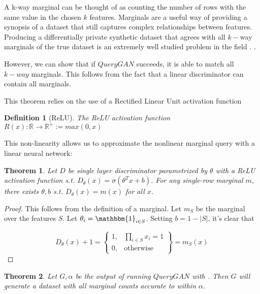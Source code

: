 \documentclass[]{article}
\newtheorem{definition}{Definition}[section]
\newtheorem{theorem}{Theorem}[section]
\theoremstyle{definition}
\begin{document}
A k-way marginal can be thought of as counting the number of rows with the same value in the chosen $k$ features. Marginals are a useful way of providing a synopsis of a dataset that still captures complex relationships between features. Producing a differentially private synthetic dataset that agrees with all $k-$way marginals of the true dataset is an extremely well studied problem in the field . .

However, we can show that if $QueryGAN$ succeeds, it is able to match all $k-way$ marginals. This follows from the fact that a linear discriminator can contain all marginals.

This theorem relies on the use of a Rectified Linear Unit activation function

\begin{definition}[ReLU]
    The ReLU activation function $R(x) : \mathbb{R} \to \mathbb{R}^+ := max(0,x)$
\end{definition}

This non-linearity allows us to approximate the nonlinear marginal query with a linear neural network:

\begin{theorem}\label{thm:d-marginal}
    Let $D$ be single layer discriminator parametrized by $\theta$ with a ReLU activation function s.t. $D_\theta(x) = \sigma(\theta^Tx + b)$. For any single-row marginal $m$, there exists $\theta, b$ s.t. $D_\theta(x) = m(x)$ for all $x$.  
\end{theorem} 

\begin{proof}
    This follows from the definition of a marginal. Let $m_S$ be the marginal over the features $S$. Let $\theta_i = \mathbbm{1}_{i \in S}$. Setting $b = 1-|S|$, it's clear that 
    

    \begin{equation}
        D_\theta(x) + 1 = \left.
        \begin{cases}
          1, & \prod_{i \in S} x_i = 1 \\
          0, & \text{otherwise }
        \end{cases}
        \right\} = m_S(x)
    \end{equation}
\end{proof}

\begin{theorem}
    Let $G, \alpha$ be the output of running $QueryGAN$ with . Then $G$ will generate a dataset with all marginal counts accurate to within $\alpha$.
\end{theorem}
\end{document}
